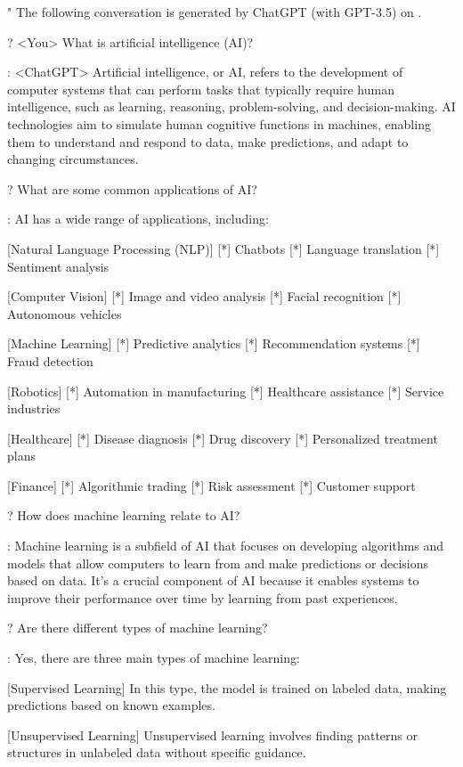 "
  The following conversation is generated by ChatGPT (with GPT-3.5) on .

? <You>
  What is artificial intelligence (AI)?

: <ChatGPT>
  Artificial intelligence, or AI, refers to the development of computer systems that can perform tasks that typically require human intelligence, such as learning, reasoning, problem-solving, and decision-making. AI technologies aim to simulate human cognitive functions in machines, enabling them to understand and respond to data, make predictions, and adapt to changing circumstances.

?
  What are some common applications of AI?

:
  AI has a wide range of applications, including:

  [Natural Language Processing (NLP)]
    [*] Chatbots
    [*] Language translation
    [*] Sentiment analysis

  [Computer Vision]
    [*] Image and video analysis
    [*] Facial recognition
    [*] Autonomous vehicles

  [Machine Learning]
    [*] Predictive analytics
    [*] Recommendation systems
    [*] Fraud detection

  [Robotics]
    [*] Automation in manufacturing
    [*] Healthcare assistance
    [*] Service industries

  [Healthcare]
    [*] Disease diagnosis
    [*] Drug discovery
    [*] Personalized treatment plans

  [Finance]
    [*] Algorithmic trading
    [*] Risk assessment
    [*] Customer support

?
  How does machine learning relate to AI?

:
  Machine learning is a subfield of AI that focuses on developing algorithms and models that allow computers to learn from and make predictions or decisions based on data. It's a crucial component of AI because it enables systems to improve their performance over time by learning from past experiences.

?
  Are there different types of machine learning?

:
  Yes, there are three main types of machine learning:

  [Supervised Learning]
    In this type, the model is trained on labeled data, making predictions based on known examples.

  [Unsupervised Learning]
    Unsupervised learning involves finding patterns or structures in unlabeled data without specific guidance.

